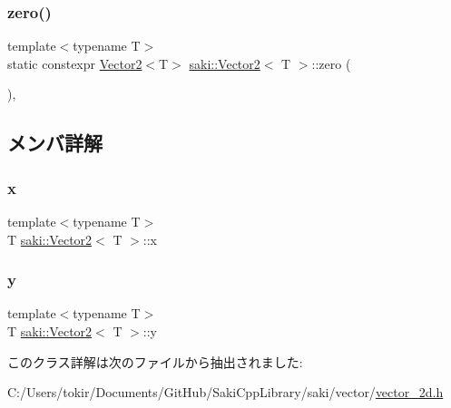 \subsubsection{\texorpdfstring{zero()}{zero()}}
{\footnotesize\ttfamily template$<$typename T$>$ \\
static constexpr \mbox{\hyperlink{classsaki_1_1_vector2}{Vector2}}$<$T$>$ \mbox{\hyperlink{classsaki_1_1_vector2}{saki\+::\+Vector2}}$<$ T $>$\+::zero (\begin{DoxyParamCaption}{ }\end{DoxyParamCaption})\hspace{0.3cm}{\ttfamily [inline]}, {\ttfamily [static]}}



\subsection{メンバ詳解}
\mbox{\label{classsaki_1_1_vector2_a69df7df6da198f35ef8ed269eb095c27}} 
\subsubsection{\texorpdfstring{x}{x}}
{\footnotesize\ttfamily template$<$typename T$>$ \\
T \mbox{\hyperlink{classsaki_1_1_vector2}{saki\+::\+Vector2}}$<$ T $>$\+::x}

\mbox{\label{classsaki_1_1_vector2_a54e83290254fb653eff9b8dcf6a10878}} 
\subsubsection{\texorpdfstring{y}{y}}
{\footnotesize\ttfamily template$<$typename T$>$ \\
T \mbox{\hyperlink{classsaki_1_1_vector2}{saki\+::\+Vector2}}$<$ T $>$\+::y}



このクラス詳解は次のファイルから抽出されました\+:\begin{DoxyCompactItemize}
\item 
C\+:/\+Users/tokir/\+Documents/\+Git\+Hub/\+Saki\+Cpp\+Library/saki/vector/\mbox{\hyperlink{vector__2d_8h}{vector\+\_\+2d.\+h}}\end{DoxyCompactItemize}
